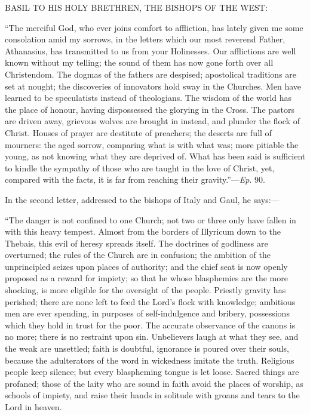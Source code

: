 BASIL TO HIS HOLY BRETHREN, THE BISHOPS OF THE WEST:

``The merciful God, who ever joins comfort to affliction, has
lately given me some consolation amid my sorrows, in the letters which
our most reverend Father, Athanasius, has transmitted to us from your Holinesses. Our afflictions are well known without
my telling; the sound of them has now gone forth over all Christendom.
The dogmas of the fathers are despised; apostolical traditions are set
at nought; the discoveries of innovators hold sway in the Churches.
Men have learned to be speculatists instead of theologians. The wisdom
of the world has the place of honour, having dispossessed the glorying
in the Cross. The pastors are driven away, grievous wolves are brought
in instead, and plunder the flock of Christ. Houses of prayer are
destitute of preachers; the deserts are full of mourners: the aged
sorrow, comparing what is with what was; more pitiable the young, as
not knowing what they are deprived of. What has been said is
sufficient to kindle the sympathy of those who are taught in the love
of Christ, yet, compared with the facts, it is far from reaching their
gravity.''—\emph{Ep}. 90.

In the second letter, addressed to the bishops of Italy and Gaul,
he says:—

``The danger is not confined to one Church; not two or three
only have fallen in with this heavy tempest. Almost from the borders
of Illyricum down to the Thebais, this evil of heresy spreads itself.
The doctrines of godliness are overturned; the rules of the Church are
in confusion; the ambition of the unprincipled seizes upon places of
authority; and the chief seat is now openly proposed as a reward for
impiety; so that he whose blasphemies are the more shocking, is more
eligible for the oversight of the people. Priestly gravity has
perished; there are none left to feed the Lord's flock with knowledge;
ambitious men are ever spending, in purposes of self-indulgence and
bribery, possessions which they hold in trust for the poor. The
accurate observance of the canons is no more; there is no restraint
upon sin. Unbelievers laugh at what they see, and the weak are
unsettled; faith is doubtful, ignorance is poured over their souls,
because the adulterators of the word in wickedness imitate the truth.
Religious people keep silence; but every blaspheming tongue is let
loose. Sacred things are profaned; those of the laity who are sound in
faith avoid the places of worship, as schools of impiety, and raise
their hands in solitude with groans and tears to the Lord in heaven.

